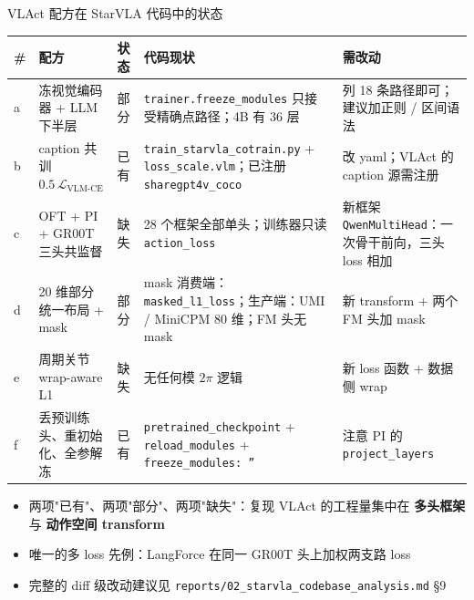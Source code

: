 \documentclass[aspectratio=169,10pt]{beamer}
\newcommand{\con}[1]{\textcolor{negative}{#1}}
\newcommand{\HL}[1]{\textcolor{emphasis}{#1}}
\begin{document}
\begin{frame}{VLAct 配方在 StarVLA 代码中的状态}
  \begin{center}\footnotesize\setlength{\tabcolsep}{4pt}
  \begin{tabular}{p{0.4cm}p{3.3cm}p{0.9cm}p{4.2cm}p{3.8cm}}
    \toprule
    \# & 配方 & 状态 & 代码现状 & 需改动 \\
    \midrule
    a & 冻视觉编码器 + LLM 下半层 & \con{部分} & \texttt{trainer.freeze\_modules} 只接受精确点路径；4B 有 36 层 & 列 18 条路径即可；建议加正则 / 区间语法 \\
    b & caption 共训 $0.5\,\mathcal{L}_{\text{VLM-CE}}$ & \HL{已有} & \texttt{train\_starvla\_cotrain.py} + \texttt{loss\_scale.vlm}；已注册 \texttt{sharegpt4v\_coco} & 改 yaml；VLAct 的 caption 源需注册 \\
    c & OFT + PI + GR00T 三头共监督 & \con{缺失} & 28 个框架全部单头；训练器只读 \texttt{action\_loss} & 新框架 \texttt{QwenMultiHead}：一次骨干前向，三头 loss 相加 \\
    d & 20 维部分统一布局 + mask & \con{部分} & mask 消费端：\texttt{masked\_l1\_loss}；生产端：UMI / MiniCPM 80 维；FM 头无 mask & 新 transform + 两个 FM 头加 mask \\
    e & 周期关节 wrap-aware L1 & \con{缺失} & 无任何模 $2\pi$ 逻辑 & 新 loss 函数 + 数据侧 wrap \\
    f & 丢预训练头、重初始化、全参解冻 & \HL{已有} & \texttt{pretrained\_checkpoint} + \texttt{reload\_modules} + \texttt{freeze\_modules: ''} & 注意 PI 的 \texttt{project\_layers} \\
    \bottomrule
  \end{tabular}
  \end{center}
  \vspace{4pt}
  \begin{itemize}
    \item 两项"已有"、两项"部分"、两项"缺失"：复现 VLAct 的工程量集中在 \textbf{多头框架} 与 \textbf{动作空间 transform}
    \item 唯一的多 loss 先例：LangForce 在同一 GR00T 头上加权两支路 loss
    \item 完整的 diff 级改动建议见 \texttt{reports/02\_starvla\_codebase\_analysis.md} §9
  \end{itemize}
\end{frame}

\end{document}
